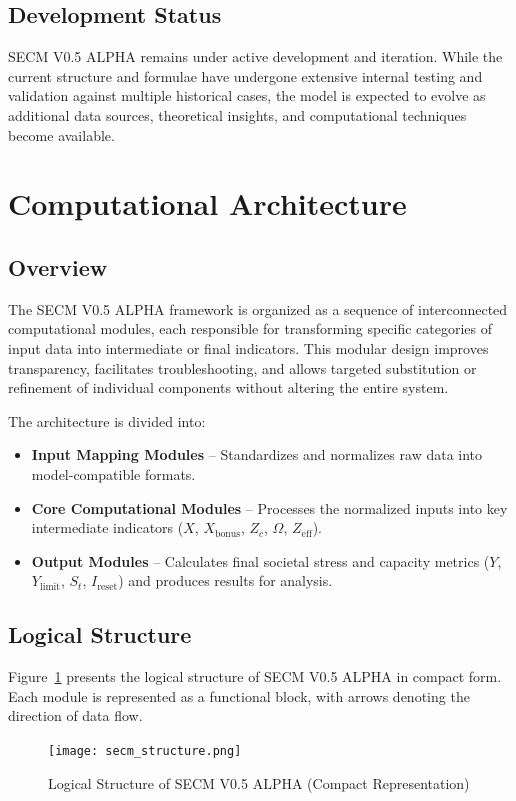 \documentclass[12pt,a4paper]{article}
\begin{document}
\subsection{Development Status}
SECM V0.5 ALPHA remains under active development and iteration. While the current structure and formulae have undergone extensive internal testing and validation against multiple historical cases, the model is expected to evolve as additional data sources, theoretical insights, and computational techniques become available.
\section{Computational Architecture}

\subsection{Overview}
The SECM V0.5 ALPHA framework is organized as a sequence of interconnected computational modules, each responsible for transforming specific categories of input data into intermediate or final indicators. This modular design improves transparency, facilitates troubleshooting, and allows targeted substitution or refinement of individual components without altering the entire system.

The architecture is divided into:
\begin{itemize}
    \item \textbf{Input Mapping Modules} – Standardizes and normalizes raw data into model-compatible formats.
    \item \textbf{Core Computational Modules} – Processes the normalized inputs into key intermediate indicators (\(X\), \(X_{\text{bonus}}\), \(Z_c\), \(\Omega\), \(Z_{\mathrm{eff}}\)).
    \item \textbf{Output Modules} – Calculates final societal stress and capacity metrics (\(Y\), \(Y_{\mathrm{limit}}\), \(S_t\), \(I_{\mathrm{reset}}\)) and produces results for analysis.
\end{itemize}

\subsection{Logical Structure}
Figure~\ref{fig:structure} presents the logical structure of SECM V0.5 ALPHA in compact form. Each module is represented as a functional block, with arrows denoting the direction of data flow.

\begin{figure}[htbp]
    \centering
    \texttt{[image: secm\_structure.png]}
    \caption{Logical Structure of SECM V0.5 ALPHA (Compact Representation)}
    \label{fig:structure}
\end{figure}
\end{document}
